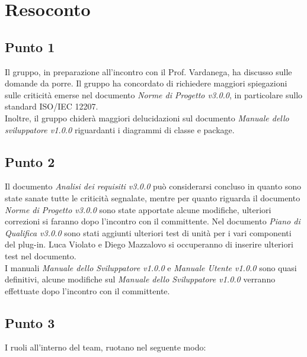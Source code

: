 \section{Resoconto}

\subsection{Punto 1}
Il gruppo, in preparazione all'incontro con il Prof. Vardanega, ha discusso sulle domande da porre. Il gruppo ha concordato di richiedere maggiori spiegazioni sulle criticità emerse nel documento \textit{Norme di Progetto v3.0.0}, in particolare sullo standard ISO/IEC 12207. \\
Inoltre, il gruppo chiderà maggiori delucidazioni sul documento \textit{Manuale dello sviluppatore v1.0.0} riguardanti i diagrammi di classe e package.

\subsection{Punto 2}
Il documento \textit{Analisi dei requisiti v3.0.0} può considerarsi concluso in quanto sono state sanate tutte le criticità segnalate, mentre per quanto riguarda il documento \textit{Norme di Progetto v3.0.0} sono state apportate alcune modifiche, ulteriori correzioni si faranno dopo l'incontro con il committente.
Nel documento \textit{Piano di Qualifica v3.0.0} sono stati aggiunti ulteriori test di unità per i vari componenti del plug-in. Luca Violato e Diego Mazzalovo si occuperanno di inserire ulteriori test nel documento. \\
I manuali \textit{Manuale dello Sviluppatore v1.0.0} e \textit{Manuale Utente v1.0.0} sono quasi definitivi, alcune modifiche sul \textit{Manuale dello Sviluppatore v1.0.0} verranno effettuate dopo l'incontro con il committente.
 

\subsection{Punto 3}
I ruoli all'interno del team, ruotano nel seguente modo:\\

